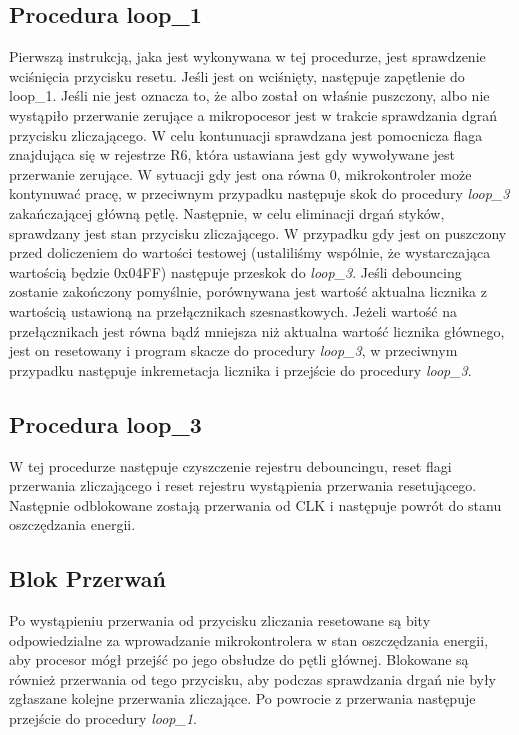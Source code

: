 \documentclass[fleqn]{article}
\begin{document}
\subsection{Procedura loop\_1}
		Pierwszą instrukcją, jaka jest wykonywana w tej procedurze, jest sprawdzenie wciśnięcia przycisku resetu. Jeśli jest on wciśnięty, następuje zapętlenie do loop\_1. Jeśli nie jest oznacza to, że albo został on właśnie puszczony, albo nie wystąpiło przerwanie zerujące a mikropocesor jest w trakcie sprawdzania dgrań przycisku zliczającego. W celu kontunuacji sprawdzana jest pomocnicza flaga znajdująca się w rejestrze R6, która ustawiana jest gdy wywoływane jest przerwanie zerujące. W sytuacji gdy jest ona równa 0, mikrokontroler może kontynuwać pracę, w przeciwnym przypadku następuje skok do procedury \textit{loop\_3} zakańczającej główną pętlę. Następnie, w celu eliminacji drgań styków, sprawdzany jest stan przycisku zliczającego. W przypadku gdy jest on puszczony przed doliczeniem do wartości testowej (ustaliliśmy wspólnie, że wystarczająca wartością będzie 0x04FF) następuje przeskok do \textit{loop\_3}. Jeśli debouncing zostanie zakończony pomyślnie, porównywana jest wartość aktualna licznika z wartością ustawioną na przełącznikach szesnastkowych. Jeżeli wartość na przełącznikach jest równa bądź mniejsza niż aktualna wartość licznika głównego, jest on resetowany i program skacze do procedury \textit{loop\_3}, w przeciwnym przypadku następuje inkremetacja licznika i przejście do procedury \textit{loop\_3}.

\subsection{Procedura loop\_3}
		W tej procedurze następuje czyszczenie rejestru debouncingu, reset flagi przerwania zliczającego i reset rejestru wystąpienia przerwania resetującego. Następnie odblokowane zostają przerwania od CLK i następuje powrót do stanu oszczędzania energii.

\subsection{Blok Przerwań}
		Po wystąpieniu przerwania od przycisku zliczania resetowane są bity odpowiedzialne za wprowadzanie mikrokontrolera w stan oszczędzania energii, aby procesor mógł przejść po jego obsłudze do pętli głównej. Blokowane są również przerwania od tego przycisku, aby podczas sprawdzania drgań nie były zgłaszane kolejne przerwania zliczające. Po powrocie z przerwania następuje przejście do procedury \textit{loop\_1}.
\end{document}

